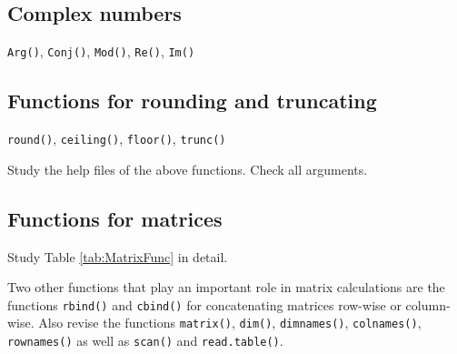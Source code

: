 \documentclass[
]{book}
\begin{document}
\subsection{Complex numbers}\label{complex-numbers}

\texttt{Arg()}, \texttt{Conj()}, \texttt{Mod()}, \texttt{Re()}, \texttt{Im()}

\subsection{Functions for rounding and truncating}\label{functions-for-rounding-and-truncating}

\texttt{round()}, \texttt{ceiling()}, \texttt{floor()}, \texttt{trunc()}

Study the help files of the above functions. Check all arguments.

\subsection{Functions for matrices}\label{functions-for-matrices}

Study Table \ref{tab:MatrixFunc} in detail.

Two other functions that play an important role in matrix calculations are the functions \texttt{rbind()} and \texttt{cbind()} for concatenating matrices row-wise or column-wise. Also revise the functions \texttt{matrix()}, \texttt{dim()}, \texttt{dimnames()}, \texttt{colnames()}, \texttt{rownames()} as well as \texttt{scan()} and \texttt{read.table()}.
\end{document}
